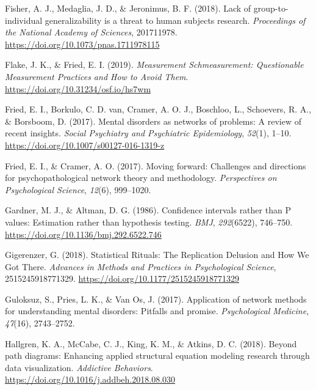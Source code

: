\documentclass[british,man]{apa6}
\begin{document}
\leavevmode\hypertarget{ref-fisherLackGrouptoindividualGeneralizability2018}{}%
Fisher, A. J., Medaglia, J. D., \& Jeronimus, B. F. (2018). Lack of group-to-individual generalizability is a threat to human subjects research. \emph{Proceedings of the National Academy of Sciences}, 201711978. \url{https://doi.org/10.1073/pnas.1711978115}

\leavevmode\hypertarget{ref-flakeMeasurementSchmeasurementQuestionable2019}{}%
Flake, J. K., \& Fried, E. I. (2019). \emph{Measurement Schmeasurement: Questionable Measurement Practices and How to Avoid Them}. \url{https://doi.org/10.31234/osf.io/hs7wm}

\leavevmode\hypertarget{ref-friedMentalDisordersNetworks2017a}{}%
Fried, E. I., Borkulo, C. D. van, Cramer, A. O. J., Boschloo, L., Schoevers, R. A., \& Borsboom, D. (2017). Mental disorders as networks of problems: A review of recent insights. \emph{Social Psychiatry and Psychiatric Epidemiology}, \emph{52}(1), 1--10. \url{https://doi.org/10.1007/s00127-016-1319-z}

\leavevmode\hypertarget{ref-friedMovingForwardChallenges2017}{}%
Fried, E. I., \& Cramer, A. O. (2017). Moving forward: Challenges and directions for psychopathological network theory and methodology. \emph{Perspectives on Psychological Science}, \emph{12}(6), 999--1020.

\leavevmode\hypertarget{ref-gardnerConfidenceIntervalsRather1986}{}%
Gardner, M. J., \& Altman, D. G. (1986). Confidence intervals rather than P values: Estimation rather than hypothesis testing. \emph{BMJ}, \emph{292}(6522), 746--750. \url{https://doi.org/10.1136/bmj.292.6522.746}

\leavevmode\hypertarget{ref-gigerenzerStatisticalRitualsReplication2018}{}%
Gigerenzer, G. (2018). Statistical Rituals: The Replication Delusion and How We Got There. \emph{Advances in Methods and Practices in Psychological Science}, 2515245918771329. \url{https://doi.org/10.1177/2515245918771329}

\leavevmode\hypertarget{ref-guloksuzApplicationNetworkMethods2017}{}%
Guloksuz, S., Pries, L. K., \& Van Os, J. (2017). Application of network methods for understanding mental disorders: Pitfalls and promise. \emph{Psychological Medicine}, \emph{47}(16), 2743--2752.

\leavevmode\hypertarget{ref-hallgrenPathDiagramsEnhancing2018}{}%
Hallgren, K. A., McCabe, C. J., King, K. M., \& Atkins, D. C. (2018). Beyond path diagrams: Enhancing applied structural equation modeling research through data visualization. \emph{Addictive Behaviors}. \url{https://doi.org/10.1016/j.addbeh.2018.08.030}
\end{document}
